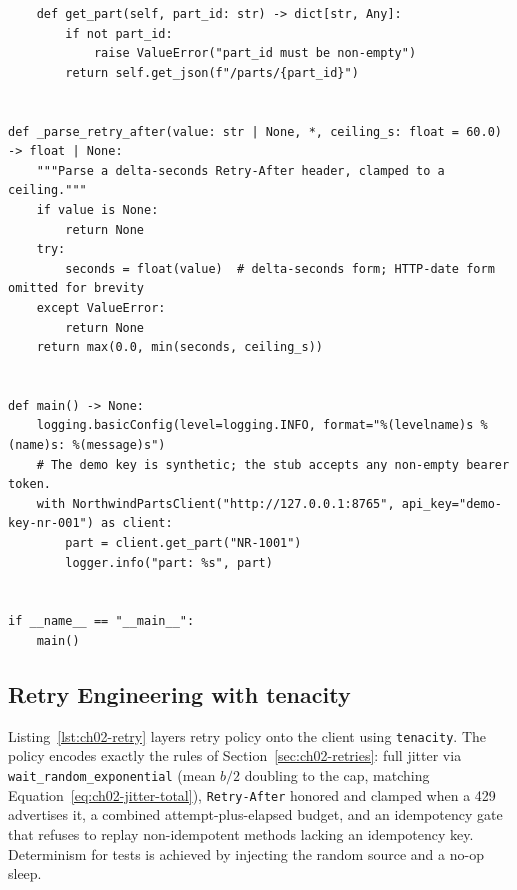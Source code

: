 \begin{verbatim}
    def get_part(self, part_id: str) -> dict[str, Any]:
        if not part_id:
            raise ValueError("part_id must be non-empty")
        return self.get_json(f"/parts/{part_id}")


def _parse_retry_after(value: str | None, *, ceiling_s: float = 60.0) -> float | None:
    """Parse a delta-seconds Retry-After header, clamped to a ceiling."""
    if value is None:
        return None
    try:
        seconds = float(value)  # delta-seconds form; HTTP-date form omitted for brevity
    except ValueError:
        return None
    return max(0.0, min(seconds, ceiling_s))


def main() -> None:
    logging.basicConfig(level=logging.INFO, format="%(levelname)s %(name)s: %(message)s")
    # The demo key is synthetic; the stub accepts any non-empty bearer token.
    with NorthwindPartsClient("http://127.0.0.1:8765", api_key="demo-key-nr-001") as client:
        part = client.get_part("NR-1001")
        logger.info("part: %s", part)


if __name__ == "__main__":
    main()
\end{verbatim}

\subsection{Retry Engineering with tenacity}
\label{sec:ch02-retry-code}

Listing~\ref{lst:ch02-retry} layers retry policy onto the client using
\texttt{tenacity}. The policy encodes exactly the rules of
Section~\ref{sec:ch02-retries}: full jitter via
\texttt{wait\_random\_exponential} (mean $b/2$ doubling to the cap, matching
Equation~\ref{eq:ch02-jitter-total}), \texttt{Retry-After} honored and clamped
when a 429 advertises it, a combined attempt-plus-elapsed budget, and an
idempotency gate that refuses to replay non-idempotent methods lacking an
idempotency key. Determinism for tests is achieved by injecting the random
source and a no-op sleep.

